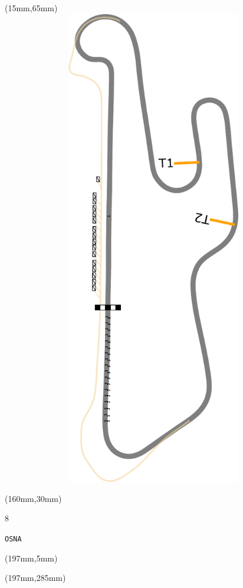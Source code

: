 \begin{textblock*}{185mm}(15mm,65mm)%
\centering
\mbox{\includegraphics[width=185mm,height=210mm,keepaspectratio]{PT/OSNA.pdf}}
\end{textblock*}
\begin{textblock*}{40mm}(160mm,30mm)%
\Large
\par{} 
\par8 
\par\hfill\tiny\tt OSNA\\
\end{textblock*}
\begin{textblock*}{20mm}(197mm,5mm)%
\fbox{\thepage}
\label{OSNA}
\end{textblock*}
\begin{textblock*}{20mm}(197mm,285mm)%
\fbox{\thepage}
\end{textblock*}

